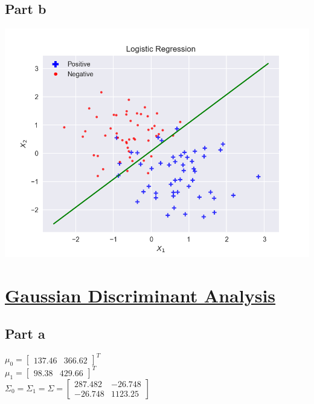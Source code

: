 \documentclass[12pt]{article}
\begin{document}
\subsection*{Part b}
\begin{center}
\includegraphics[scale=0.4]{logistic1.png}
\end{center}

\newpage
\section*{\underline{Gaussian Discriminant Analysis}}
\subsection*{Part a}
\begin{addmargin}[0.3in]{0in}
$\mu_0 = \begin{bmatrix} 137.46 & 366.62\end{bmatrix}^{T}$ \\
$\mu_1 = \begin{bmatrix} 98.38 & 429.66\end{bmatrix}^{T}$ \\
$\Sigma_0 = \Sigma_1 = \Sigma = 
\begin{bmatrix}
    287.482 &  -26.748 \\
    -26.748 & 1123.25
\end{bmatrix}$
\end{addmargin}
\end{document}
